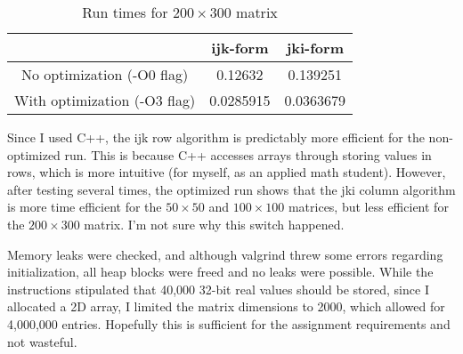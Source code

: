 \documentclass[12pt]{article}
\begin{document}
\begin{table}[h]
	\centering
	\begin{tabular}{|c|c|c|} \hline
		~ & ijk-form & jki-form \\ \hline
		No optimization (-O0 flag)&  0.12632 & 0.139251 \\ \hline
		With optimization (-O3 flag)& 0.0285915 & 0.0363679 \\ \hline
	\end{tabular}
	\caption{Run times for $200\times300$ matrix}
\end{table}

Since I used C++, the ijk row algorithm is predictably more efficient for the non-optimized run. This is because C++ accesses arrays through storing values in rows, which is more intuitive (for myself, as an applied math student). However, after testing several times, the optimized run shows that the jki column algorithm is more time efficient for the $50\times50$ and $100\times100$ matrices, but less efficient for the $200\times300$ matrix. I'm not sure why this switch happened. 

Memory leaks were checked, and although valgrind threw some errors regarding initialization, all heap blocks were freed and no leaks were possible. While the instructions stipulated that 40,000 32-bit real values should be stored, since I allocated a 2D array, I limited the matrix dimensions to 2000, which allowed for 4,000,000 entries. Hopefully this is sufficient for the assignment requirements and not wasteful.
\end{document}

